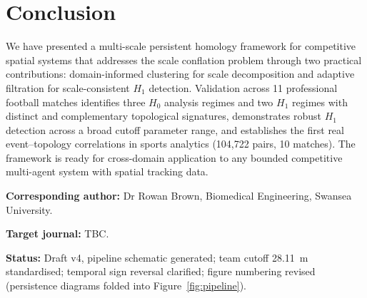 \section{Conclusion}
\label{sec:conclusion}

We have presented a multi-scale persistent homology framework for competitive spatial systems that addresses the scale conflation problem through two practical contributions: domain-informed clustering for scale decomposition and adaptive filtration for scale-consistent \(H_1\) detection. Validation across 11 professional football matches identifies three \(H_0\) analysis regimes and two \(H_1\) regimes with distinct and complementary topological signatures, demonstrates robust \(H_1\) detection across a broad cutoff parameter range, and establishes the first real event--topology correlations in sports analytics (104,722 pairs, 10 matches). The framework is ready for cross-domain application to any bounded competitive multi-agent system with spatial tracking data.

\bigskip
\noindent\textbf{Corresponding author:} Dr Rowan Brown, Biomedical Engineering, Swansea University.

\noindent\textbf{Target journal:} TBC.

\noindent\textbf{Status:} Draft v4, pipeline schematic generated; team cutoff 28.11~m standardised; temporal sign reversal clarified; figure numbering revised (persistence diagrams folded into Figure~\ref{fig:pipeline}).
